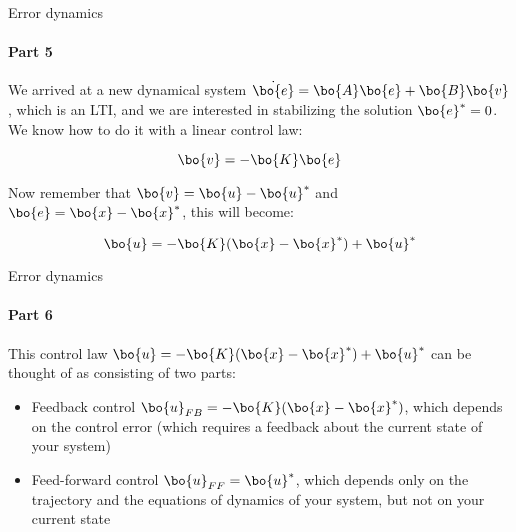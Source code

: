 \documentclass{beamer}
\begin{document}
\begin{frame}{Error dynamics}
\framesubtitle{Part 5}
\begin{flushleft}

We arrived at a new dynamical system $\dot{\bo{e}} = \bo{A}\bo{e} + \bo{B}\bo{v}$, which is an LTI, and we are interested in stabilizing the solution $\bo{e}^* = 0$. We know how to do it with a linear control law:

\begin{equation}
    \bo{v} = -\bo{K}\bo{e}
\end{equation}

Now remember that $\bo{v} = \bo{u} - \bo{u}^*$ and $\bo{e} = \bo{x} - \bo{x}^*$, this will become:

\begin{equation}
    \bo{u} = -\bo{K}(\bo{x} - \bo{x}^*) + \bo{u}^*
\end{equation}

\end{flushleft}
\end{frame}



\begin{frame}{Error dynamics}
\framesubtitle{Part 6}
\begin{flushleft}

This control law $\bo{u} = -\bo{K}(\bo{x} - \bo{x}^*) + \bo{u}^*$ can be thought of as consisting of two parts:

\begin{itemize}
    \item Feedback control $\bo{u}_{FB} = -\bo{K}(\bo{x} - \bo{x}^*)$, which depends on the control error (which requires a feedback about the current state of your system)
    \item Feed-forward control $\bo{u}_{FF} = \bo{u}^*$, which depends only on the trajectory and the equations of dynamics of your system, but not on your current state
\end{itemize}

\end{flushleft}
\end{frame}
\end{document}
